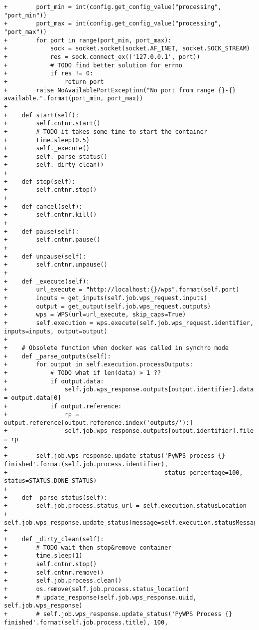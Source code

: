 \begin{lstlisting}[basicstyle=\small,caption={pywps diff file}]
+        port_min = int(config.get_config_value("processing", "port_min"))
+        port_max = int(config.get_config_value("processing", "port_max"))
+        for port in range(port_min, port_max):
+            sock = socket.socket(socket.AF_INET, socket.SOCK_STREAM)
+            res = sock.connect_ex(('127.0.0.1', port))
+            # TODO find better solution for errno
+            if res != 0:
+                return port
+        raise NoAvailablePortException("No port from range {}-{} available.".format(port_min, port_max))
+
+    def start(self):
+        self.cntnr.start()
+        # TODO it takes some time to start the container
+        time.sleep(0.5)
+        self._execute()
+        self._parse_status()
+        self._dirty_clean()
+
+    def stop(self):
+        self.cntnr.stop()
+
+    def cancel(self):
+        self.cntnr.kill()
+
+    def pause(self):
+        self.cntnr.pause()
+
+    def unpause(self):
+        self.cntnr.unpause()
+
+    def _execute(self):
+        url_execute = "http://localhost:{}/wps".format(self.port)
+        inputs = get_inputs(self.job.wps_request.inputs)
+        output = get_output(self.job.wps_request.outputs)
+        wps = WPS(url=url_execute, skip_caps=True)
+        self.execution = wps.execute(self.job.wps_request.identifier, inputs=inputs, output=output)
+
+    # Obsolete function when docker was called in synchro mode
+    def _parse_outputs(self):
+        for output in self.execution.processOutputs:
+            # TODO what if len(data) > 1 ??
+            if output.data:
+                self.job.wps_response.outputs[output.identifier].data = output.data[0]
+            if output.reference:
+                rp = output.reference[output.reference.index('outputs/'):]
+                self.job.wps_response.outputs[output.identifier].file = rp
+
+        self.job.wps_response.update_status('PyWPS process {} finished'.format(self.job.process.identifier),
+                                            status_percentage=100, status=STATUS.DONE_STATUS)
+
+    def _parse_status(self):
+        self.job.process.status_url = self.execution.statusLocation
+        self.job.wps_response.update_status(message=self.execution.statusMessage)
+
+    def _dirty_clean(self):
+        # TODO wait then stop&remove container
+        time.sleep(1)
+        self.cntnr.stop()
+        self.cntnr.remove()
+        self.job.process.clean()
+        os.remove(self.job.process.status_location)
+        # update_response(self.job.wps_response.uuid, self.job.wps_response)
+        # self.job.wps_response.update_status('PyWPS Process {} finished'.format(self.job.process.title), 100,

\end{lstlisting}
